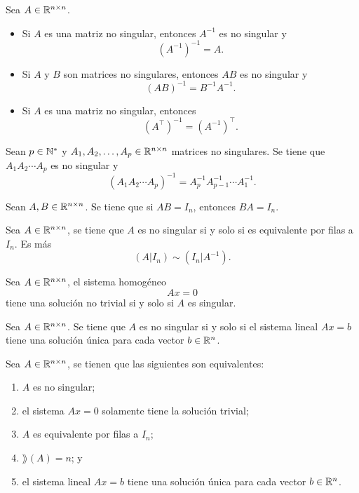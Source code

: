 \documentclass[a4,11pt]{aleph-notas}
\begin{document}
\begin{teo}
    Sea $A\in \Mat[\R]{n}{n}$. 
    \begin{itemize}
    \item 
        Si $A$ es una matriz no singular, entonces $A^{-1}$ es no singular y 
        \[ 
            (A^{-1})^{-1} = A.
        \]
    \item 
        Si $A$ y $B$ son matrices no singulares, entonces $AB$ es no singular y 
        \[ 
            (AB)^{-1} = B^{-1}A^{-1}.
        \]
    \item 
        Si $A$ es una matriz no singular, entonces
        \[
            {(A^\intercal)}^{-1} = {(A^{-1})}^\intercal.
        \]
    \end{itemize}
\end{teo}

\begin{teo}
    Sean $p\in\N^*$ y $A_1, A_2, \ldots, A_p \in \Mat[\R]{n}{n}$ matrices no singulares. Se tiene que $A_1 A_2 \cdots A_p$ es no singular y 
    \[
        (A_1 A_2 \cdots A_p)^{-1} = A_p^{-1} A_{p-1}^{-1} \cdots A_1^{-1}.
    \]
\end{teo}

\begin{teo}
    Sean $A, B \in \Mat[\R]{n}{n}$. Se tiene que si $AB=I_n$, entonces $BA=I_n$.
\end{teo}

\begin{teo}
    Sea $A \in \Mat[\R]{n}{n}$, se tiene que $A$ es no singular si y solo si es equivalente por filas a $I_n$. Es más
    \[
        (A|I_n) \sim (I_n|A^{-1}).
    \]
\end{teo}

\begin{teo}
    Sea $A \in \Mat[\R]{n}{n}$, el sistema homogéneo 
    \[
        Ax = 0
    \]
    tiene una solución no trivial si y solo si $A$ es singular. 
\end{teo}

\begin{teo}
    Sea $A \in \Mat[\R]{n}{n}$. Se tiene que $A$ es no singular si y solo si el sistema lineal $Ax=b$ tiene una solución única para cada vector $b \in \R^{n}$.
\end{teo}

\begin{teo}
    Sea $A \in \Mat[\R]{n}{n}$, se tienen que las siguientes son equivalentes:
    \begin{enumerate}
    \item 
        $A$ es no singular;
    \item 
        el sistema $Ax=0$ solamente tiene la solución trivial;
    \item 
        $A$ es equivalente por filas a $I_n$;
    \item 
        $\rang(A)=n$; y 
    \item 
        el sistema lineal $Ax=b$ tiene una solución única para cada vector $b \in \R^{n}$. 
    \end{enumerate}
\end{teo}
\end{document}
